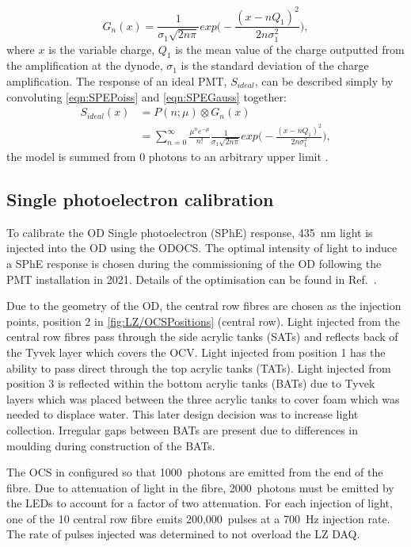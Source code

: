 \begin{equation}\label{eqn:SPEGauss}
    G_n(x)=\frac{1}{\sigma_1\sqrt{2n\pi}}exp\biggl(-\frac{(x-nQ_1)^2}{2n\sigma_1^2}\biggl),
\end{equation}
where $x$ is the variable charge, $Q_1$ is the mean value of the charge outputted from the amplification at the dynode, $\sigma_1$ is the standard deviation of the charge amplification.
The response of an ideal PMT, $S_{ideal}$, can be described simply by convoluting \autoref{eqn:SPEPoiss} and \autoref{eqn:SPEGauss} together:
\begin{equation}
    \begin{split}
    S_{ideal}(x) & = P(n;\mu)\otimes G_n(x) \\
    & = \sum^\infty_{n=0}\frac{\mu^{n}e^{-\mu}}{n!}\frac{1}{\sigma_1\sqrt{2n\pi}}exp\biggl(-\frac{(x-nQ_1)^2}{2n\sigma_1^2}\biggl),
    \end{split}
    \label{eqn:PoisPlusGauss}
\end{equation}
the model is summed from 0 photons to an arbitrary upper limit \cite{BELLAMY1994468}.
\subsection{Single photoelectron calibration}\label{sec:ODComissioning/SPhECalib}
To calibrate the OD Single photoelectron (SPhE) response, 435~nm light is injected into the OD using the ODOCS. The optimal intensity of light to induce a SPhE response is chosen during the commissioning of the OD following the PMT installation in 2021. Details of the optimisation can be found in Ref.~\cite{edfraser:thesis}.

Due to the geometry of the OD, the central row fibres are chosen as the injection points, position 2 in \autoref{fig:LZ/OCSPositions} (central row). Light injected from the central row fibres pass through the side acrylic tanks (SATs) and reflects back of the Tyvek layer which covers the OCV.
Light injected from position 1 has the ability to pass direct through the top acrylic tanks (TATs). Light injected from position 3 is reflected within the bottom acrylic tanks (BATs) due to Tyvek layers which was placed between the three acrylic tanks to cover foam which was needed to displace water. This later design decision was to increase light collection. Irregular gaps between BATs are present due to differences in moulding during construction of the BATs.

The OCS in configured so that 1000~photons are emitted from the end of the fibre. Due to attenuation of light in the fibre, 2000~photons must be emitted by the LEDs to account for a factor of two attenuation. For each injection of light, one of the 10 central row fibre emits 200,000~pulses at a 700~Hz injection rate. The rate of pulses injected was determined to not overload the LZ DAQ.

